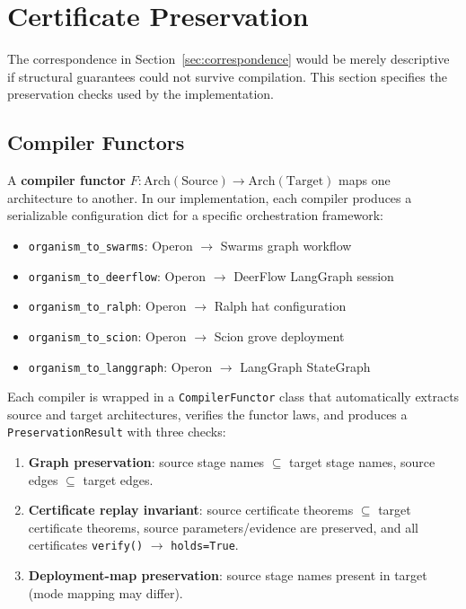 \section{Certificate Preservation}\label{sec:preservation}

The correspondence in Section~\ref{sec:correspondence} would be merely descriptive if structural guarantees could not survive compilation. This section specifies the preservation checks used by the implementation.

\subsection{Compiler Functors}

A \textbf{compiler functor} $F: \mathrm{Arch}(\text{Source}) \to \mathrm{Arch}(\text{Target})$ maps one architecture to another. In our implementation, each compiler produces a serializable configuration dict for a specific orchestration framework:

\begin{itemize}[leftmargin=*]
\item \texttt{organism\_to\_swarms}: Operon $\to$ Swarms graph workflow
\item \texttt{organism\_to\_deerflow}: Operon $\to$ DeerFlow LangGraph session
\item \texttt{organism\_to\_ralph}: Operon $\to$ Ralph hat configuration
\item \texttt{organism\_to\_scion}: Operon $\to$ Scion grove deployment
\item \texttt{organism\_to\_langgraph}: Operon $\to$ LangGraph StateGraph
\end{itemize}

Each compiler is wrapped in a \texttt{CompilerFunctor} class that automatically extracts source and target architectures, verifies the functor laws, and produces a \texttt{PreservationResult} with three checks:

\begin{enumerate}[leftmargin=*]
\item \textbf{Graph preservation}: source stage names $\subseteq$ target stage names, source edges $\subseteq$ target edges.
\item \textbf{Certificate replay invariant}: source certificate theorems $\subseteq$ target certificate theorems, source parameters/evidence are preserved, and all certificates \texttt{verify()} $\to$ \texttt{holds=True}.
\item \textbf{Deployment-map preservation}: source stage names present in target (mode mapping may differ).
\end{enumerate}

